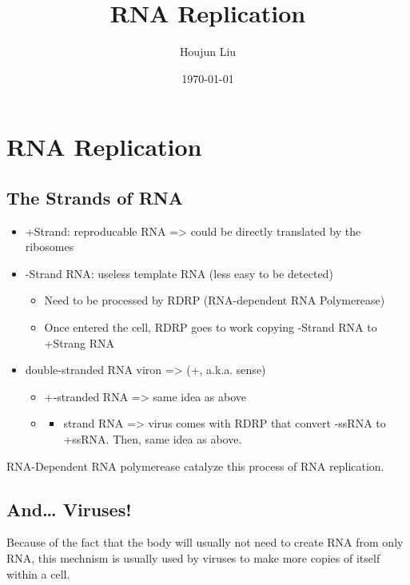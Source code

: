 \documentclass[letterpaper]{article}
\author{Houjun Liu}
\date{\today}
\title{RNA Replication}
\renewcommand\maketitle{}
\begin{document}
\maketitle


\section{RNA Replication}
\label{sec:org57707af}
\subsection{The Strands of RNA}
\label{sec:org00003b1}
\begin{itemize}
\item +Strand: reproducable RNA => could be directly translated by the
ribosomes
\item -Strand RNA: useless template RNA (less easy to be detected)

\begin{itemize}
\item Need to be processed by RDRP (RNA-dependent RNA Polymerease)
\item Once entered the cell, RDRP goes to work copying -Strand RNA to
+Strang RNA
\end{itemize}

\item double-stranded RNA viron => (+, a.k.a. sense)

\begin{itemize}
\item +-stranded RNA => same idea as above

\item \begin{itemize}
\item strand RNA => virus comes with RDRP that convert -ssRNA to +ssRNA.
Then, same idea as above.
\end{itemize}
\end{itemize}
\end{itemize}

RNA-Dependent RNA polymerease catalyze this process of RNA replication.

\subsection{And\ldots{} Viruses!}
\label{sec:org7e8c783}
Because of the fact that the body will usually not need to create RNA
from only RNA, this mechnism is usually used by viruses to make more
copies of itself within a cell.
\end{document}
